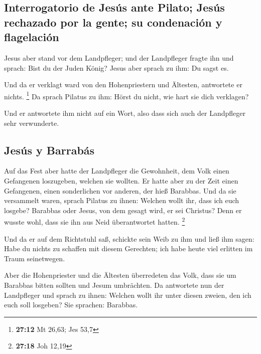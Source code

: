 \hypertarget{interrogatorio-de-jesuxfas-ante-pilato-jesuxfas-rechazado-por-la-gente-su-condenaciuxf3n-y-flagelaciuxf3n}{%
\subsection{Interrogatorio de Jesús ante Pilato; Jesús rechazado por la
gente; su condenación y
flagelación}\label{interrogatorio-de-jesuxfas-ante-pilato-jesuxfas-rechazado-por-la-gente-su-condenaciuxf3n-y-flagelaciuxf3n}}

 Jesus aber stand vor dem Landpfleger; und der
Landpfleger fragte ihn und sprach: Bist du der Juden König? Jesus aber
sprach zu ihm: Du sagst es.

 Und da er verklagt ward von den Hohenpriestern und
Ältesten, antwortete er nichts. \footnote{\textbf{27:12} Mt 26,63; Jes
  53,7}  Da sprach Pilatus zu ihm: Hörst du nicht, wie
hart sie dich verklagen?

 Und er antwortete ihm nicht auf ein Wort, also dass sich
auch der Landpfleger sehr verwunderte.

\hypertarget{jesuxfas-y-barrabuxe1s}{%
\subsection{Jesús y Barrabás}\label{jesuxfas-y-barrabuxe1s}}

 Auf das Fest aber hatte der Landpfleger die Gewohnheit,
dem Volk einen Gefangenen loszugeben, welchen sie wollten.
 Er hatte aber zu der Zeit einen Gefangenen, einen
sonderlichen vor anderen, der hieß Barabbas.  Und da sie
versammelt waren, sprach Pilatus zu ihnen: Welchen wollt ihr, dass ich
euch losgebe? Barabbas oder Jesus, von dem gesagt wird, er sei Christus?
 Denn er wusste wohl, dass sie ihn aus Neid überantwortet
hatten. \footnote{\textbf{27:18} Joh 12,19}

 Und da er auf dem Richtstuhl saß, schickte sein Weib zu
ihm und ließ ihm sagen: Habe du nichts zu schaffen mit diesem Gerechten;
ich habe heute viel erlitten im Traum seinetwegen.

 Aber die Hohenpriester und die Ältesten überredeten das
Volk, dass sie um Barabbas bitten sollten und Jesum umbrächten.
 Da antwortete nun der Landpfleger und sprach zu ihnen:
Welchen wollt ihr unter diesen zweien, den ich euch soll losgeben? Sie
sprachen: Barabbas.

